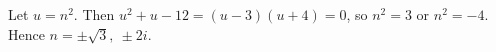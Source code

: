 Let $u=n^2$. Then $u^2+u-12=(u-3)(u+4)=0$, so $n^2=3$ or $n^2=-4$. Hence $\boxed{n=\pm\sqrt3,\ \pm2i}$.
